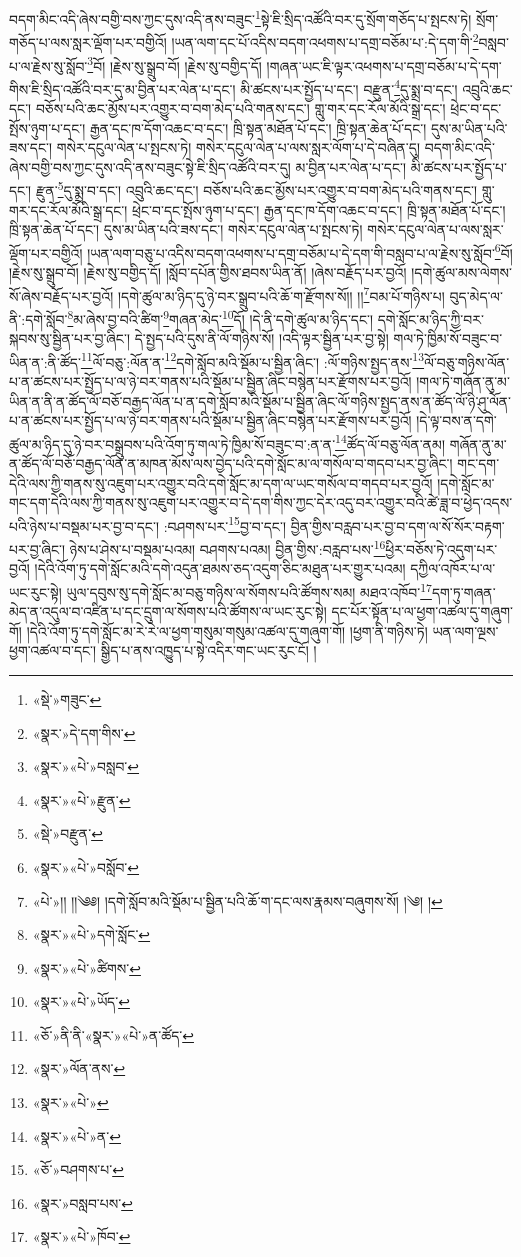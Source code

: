 བདག་མིང་འདི་ཞེས་བགྱི་བས་ཀྱང་དུས་འདི་ནས་བཟུང་\footnote{«སྡེ་»གཟུང་}སྟེ་ཇི་སྲིད་འཚོའི་བར་དུ་སྲོག་གཅོད་པ་སྤངས་ཏེ། སྲོག་གཅོད་པ་ལས་སླར་ལྡོག་པར་བགྱིའོ། །ཡན་ལག་དང་པོ་འདིས་བདག་འཕགས་པ་དགྲ་བཅོམ་པ་:དེ་དག་གི་\footnote{«སྣར་»དེ་དག་གིས་}བསླབ་པ་ལ་རྗེས་སུ་སློབ་\footnote{«སྣར་»«པེ་»བསླབ་}བོ། །རྗེས་སུ་སྒྲུབ་བོ། །རྗེས་སུ་བགྱིད་དོ། །གཞན་ཡང་ཇི་ལྟར་འཕགས་པ་དགྲ་བཅོམ་པ་དེ་དག་གིས་ཇི་སྲིད་འཚོའི་བར་དུ་མ་བྱིན་པར་ལེན་པ་དང་། མི་ཚངས་པར་སྤྱོད་པ་དང་། བརྫུན་\footnote{«སྣར་»«པེ་»རྫུན་}དུ་སྨྲ་བ་དང་། འབྲུའི་ཆང་དང་། བཅོས་པའི་ཆང་མྱོས་པར་འགྱུར་བ་བག་མེད་པའི་གནས་དང་། གླུ་གར་དང་རོལ་མོའི་སྒྲ་དང་། ཕྲེང་བ་དང་སྤོས་ཉུག་པ་དང་། རྒྱན་དང་ཁ་དོག་འཆང་བ་དང་། ཁྲི་སྟན་མཐོན་པོ་དང་། ཁྲི་སྟན་ཆེན་པོ་དང་། དུས་མ་ཡིན་པའི་ཟས་དང་། གསེར་དངུལ་ལེན་པ་སྤངས་ཏེ། གསེར་དངུལ་ལེན་པ་ལས་སླར་ལོག་པ་དེ་བཞིན་དུ། བདག་མིང་འདི་ཞེས་བགྱི་བས་ཀྱང་དུས་འདི་ནས་བཟུང་སྟེ་ཇི་སྲིད་འཚོའི་བར་དུ། མ་བྱིན་པར་ལེན་པ་དང་། མི་ཚངས་པར་སྤྱོད་པ་དང་། རྫུན་\footnote{«སྡེ་»བརྫུན་}དུ་སྨྲ་བ་དང་། འབྲུའི་ཆང་དང་། བཅོས་པའི་ཆང་མྱོས་པར་འགྱུར་བ་བག་མེད་པའི་གནས་དང་། གླུ་གར་དང་རོལ་མོའི་སྒྲ་དང་། ཕྲེང་བ་དང་སྤོས་ཉུག་པ་དང་། རྒྱན་དང་ཁ་དོག་འཆང་བ་དང་། ཁྲི་སྟན་མཐོན་པོ་དང་། ཁྲི་སྟན་ཆེན་པོ་དང་། དུས་མ་ཡིན་པའི་ཟས་དང་། གསེར་དངུལ་ལེན་པ་སྤངས་ཏེ། གསེར་དངུལ་ལེན་པ་ལས་སླར་ལྡོག་པར་བགྱིའོ། །ཡན་ལག་བཅུ་པ་འདིས་བདག་འཕགས་པ་དགྲ་བཅོམ་པ་དེ་དག་གི་བསླབ་པ་ལ་རྗེས་སུ་སློབ་\footnote{«སྣར་»«པེ་»བསློབ་}བོ། །རྗེས་སུ་སྒྲུབ་བོ། །རྗེས་སུ་བགྱིད་དོ། །སློབ་དཔོན་གྱིས་ཐབས་ཡིན་ནོ། །ཞེས་བརྗོད་པར་བྱའོ། །དགེ་ཚུལ་མས་ལེགས་སོ་ཞེས་བརྗོད་པར་བྱའོ། །དགེ་ཚུལ་མ་ཉིད་དུ་ཉེ་བར་སྒྲུབ་པའི་ཆོ་ག་རྫོགས་སོ།། །།\footnote{«པེ་»།། །།༄༅། །དགེ་སློབ་མའི་སྡོམ་པ་སྦྱིན་པའི་ཆོ་ག་དང་ལས་རྣམས་བཞུགས་སོ། །༄། །}བམ་པོ་གཉིས་པ། བུད་མེད་ལ་ནི་:དགེ་སློབ་\footnote{«སྣར་»«པེ་»དགེ་སློང་}མ་ཞེས་བྱ་བའི་ཚིག་\footnote{«སྣར་»«པེ་»ཚིགས་}གཞན་མེད་\footnote{«སྣར་»«པེ་»ཡོད་}དོ། །དེ་ནི་དགེ་ཚུལ་མ་ཉིད་དང་། དགེ་སློང་མ་ཉིད་ཀྱི་བར་སྐབས་སུ་སྦྱིན་པར་བྱ་ཞིང་། དེ་སྤྱད་པའི་དུས་ནི་ལོ་གཉིས་སོ། །འདི་ལྟར་སྦྱིན་པར་བྱ་སྟེ། གལ་ཏེ་ཁྱིམ་སོ་བཟུང་བ་ཡིན་ན་:ནི་ཚོད་\footnote{«ཅོ་»ནི་ནི་«སྣར་»«པེ་»ན་ཚོད་}ལོ་བཅུ་:ལོན་ན་\footnote{«སྣར་»ལོན་ནས་}དགེ་སློབ་མའི་སྡོམ་པ་སྦྱིན་ཞིང་། :ལོ་གཉིས་སྤྱད་ནས་\footnote{«སྣར་»«པེ་»}ལོ་བཅུ་གཉིས་ལོན་པ་ན་ཚངས་པར་སྤྱོད་པ་ལ་ཉེ་བར་གནས་པའི་སྡོམ་པ་སྦྱིན་ཞིང་བསྙེན་པར་རྫོགས་པར་བྱའོ། །གལ་ཏེ་གཞོན་ནུ་མ་ཡིན་ན་ནི་ན་ཚོད་ལོ་བཅོ་བརྒྱད་ལོན་པ་ན་དགེ་སློབ་མའི་སྡོམ་པ་སྦྱིན་ཞིང་ལོ་གཉིས་སྤྱད་ནས་ན་ཚོད་ལོ་ཉི་ཤུ་ལོན་པ་ན་ཚངས་པར་སྤྱོད་པ་ལ་ཉེ་བར་གནས་པའི་སྡོམ་པ་སྦྱིན་ཞིང་བསྙེན་པར་རྫོགས་པར་བྱའོ། །དེ་ལྟ་བས་ན་དགེ་ཚུལ་མ་ཉིད་དུ་ཉེ་བར་བསྒྲུབས་པའི་འོག་ཏུ་གལ་ཏེ་ཁྱིམ་སོ་བཟུང་བ་:ན་ན་\footnote{«སྣར་»«པེ་»ན་}ཚོད་ལོ་བཅུ་ལོན་ནམ། གཞོན་ནུ་མ་ན་ཚོད་ལོ་བཅོ་བརྒྱད་ལོན་ན་མཁན་མོས་ལས་བྱེད་པའི་དགེ་སློང་མ་ལ་གསོལ་བ་གདབ་པར་བྱ་ཞིང་། གང་དག་དེའི་ལས་ཀྱི་གནས་སུ་འཇུག་པར་འགྱུར་བའི་དགེ་སློང་མ་དག་ལ་ཡང་གསོལ་བ་གདབ་པར་བྱའོ། །དགེ་སློང་མ་གང་དག་དེའི་ལས་ཀྱི་གནས་སུ་འཇུག་པར་འགྱུར་བ་དེ་དག་གིས་ཀྱང་དེར་འདུ་བར་འགྱུར་བའི་ཚེ་ཟླ་བ་ཕྱེད་འདས་པའི་ཉེས་པ་བསྡམ་པར་བྱ་བ་དང་། :བཤགས་པར་\footnote{«ཅོ་»བཤགས་པ་}བྱ་བ་དང་། བྱིན་གྱིས་བརླབ་པར་བྱ་བ་དག་ལ་སོ་སོར་བརྟག་པར་བྱ་ཞིང་། ཉེས་པ་ཤེས་པ་བསྡམ་པའམ། བཤགས་པའམ། བྱིན་གྱིས་:བརླབ་པས་\footnote{«སྣར་»བསླབ་པས་}ཕྱིར་བཅོས་ཏེ་འདུག་པར་བྱའོ། །དེའི་འོག་ཏུ་དགེ་སློང་མའི་དགེ་འདུན་ཐམས་ཅད་འདུག་ཅིང་མཐུན་པར་གྱུར་པའམ། དཀྱིལ་འཁོར་པ་ལ་ཡང་རུང་སྟེ། ཡུལ་དབུས་སུ་དགེ་སློང་མ་བཅུ་གཉིས་ལ་སོགས་པའི་ཚོགས་སམ། མཐའ་འཁོབ་\footnote{«སྣར་»«པེ་»ཁོབ་}དག་ཏུ་གཞན་མེད་ན་འདུལ་བ་འཛིན་པ་དང་དྲུག་ལ་སོགས་པའི་ཚོགས་ལ་ཡང་རུང་སྟེ། དང་པོར་སྟོན་པ་ལ་ཕྱག་འཚལ་དུ་གཞུག་གོ། །དེའི་འོག་ཏུ་དགེ་སློང་མ་རེ་རེ་ལ་ཕྱག་གསུམ་གསུམ་འཚལ་དུ་གཞུག་གོ། །ཕྱག་ནི་གཉིས་ཏེ། ཡན་ལག་ལྔས་ཕྱག་འཚལ་བ་དང་། སྒྱིད་པ་ནས་འཁྱུད་པ་སྟེ་འདིར་གང་ཡང་རུང་ངོ། །
